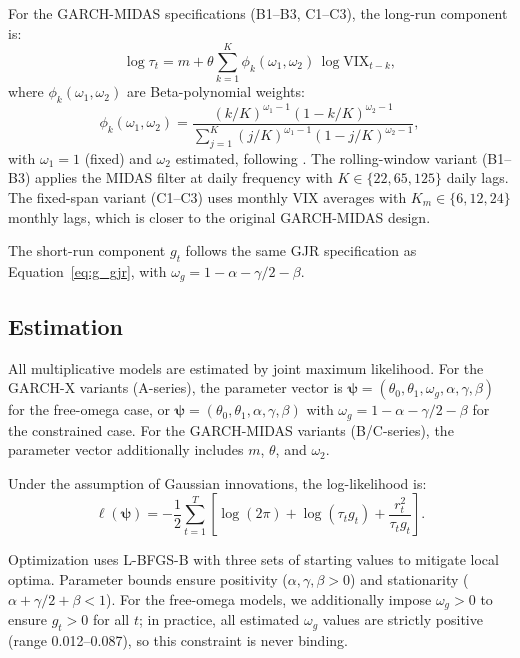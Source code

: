 \documentclass[12pt,a4paper]{article}
\newcommand{\bm}[1]{\boldsymbol{#1}}
\begin{document}
For the GARCH-MIDAS specifications (B1--B3, C1--C3), the long-run component is:
\begin{equation}
\log \tau_t = m + \theta \sum_{k=1}^{K} \phi_k(\omega_1, \omega_2) \, \log \mathrm{VIX}_{t-k},
\label{eq:midas_tau}
\end{equation}
where $\phi_k(\omega_1, \omega_2)$ are Beta-polynomial weights:
\begin{equation}
\phi_k(\omega_1, \omega_2) = \frac{(k/K)^{\omega_1-1}(1-k/K)^{\omega_2-1}}{\sum_{j=1}^{K}(j/K)^{\omega_1-1}(1-j/K)^{\omega_2-1}},
\label{eq:beta_weights}
\end{equation}
with $\omega_1 = 1$ (fixed) and $\omega_2$ estimated, following \citet{engle2013}. The rolling-window variant (B1--B3) applies the MIDAS filter at daily frequency with $K \in \{22, 65, 125\}$ daily lags. The fixed-span variant (C1--C3) uses monthly VIX averages with $K_m \in \{6, 12, 24\}$ monthly lags, which is closer to the original GARCH-MIDAS design.

The short-run component $g_t$ follows the same GJR specification as Equation~\eqref{eq:g_gjr}, with $\omega_g = 1 - \alpha - \gamma/2 - \beta$.

\subsection{Estimation}
\label{sec:estimation}

All multiplicative models are estimated by joint maximum likelihood. For the GARCH-X variants (A-series), the parameter vector is $\bm{\psi} = (\theta_0, \theta_1, \omega_g, \alpha, \gamma, \beta)$ for the free-omega case, or $\bm{\psi} = (\theta_0, \theta_1, \alpha, \gamma, \beta)$ with $\omega_g = 1 - \alpha - \gamma/2 - \beta$ for the constrained case. For the GARCH-MIDAS variants (B/C-series), the parameter vector additionally includes $m$, $\theta$, and $\omega_2$.

Under the assumption of Gaussian innovations, the log-likelihood is:
\begin{equation}
\ell(\bm{\psi}) = -\frac{1}{2}\sum_{t=1}^{T} \left[\log(2\pi) + \log(\tau_t g_t) + \frac{r_t^2}{\tau_t g_t}\right].
\label{eq:loglik}
\end{equation}

Optimization uses L-BFGS-B with three sets of starting values to mitigate local optima. Parameter bounds ensure positivity ($\alpha, \gamma, \beta > 0$) and stationarity ($\alpha + \gamma/2 + \beta < 1$). For the free-omega models, we additionally impose $\omega_g > 0$ to ensure $g_t > 0$ for all $t$; in practice, all estimated $\omega_g$ values are strictly positive (range 0.012--0.087), so this constraint is never binding.
\end{document}
